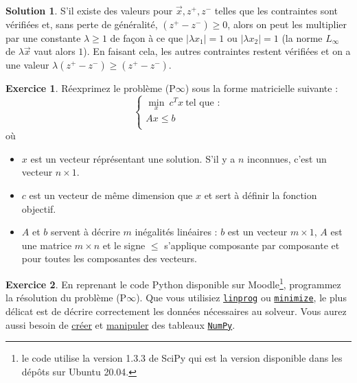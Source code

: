 \documentclass[a4paper,francais]{article}
\theoremstyle{definition}
\newtheorem{exercice}{Exercice}[section]
\newtheorem*{solution}{Solution}
\begin{document}
\begin{solution}
  S'il existe des valeurs pour $\vec{x}, z^+, z^-$ telles que
  les contraintes sont vérifiées et, sans perte de généralité,
  $(z^+ - z^-) \geq 0$, alors on peut les multiplier par une
  constante $\lambda \geq 1$ de façon à ce que $|\lambda x_1|=1$
  ou $|\lambda x_2|=1$
  (la norme $L_\infty$ de $\lambda\vec{x}$ vaut alors $1$).
  En faisant cela, les autres contraintes restent vérifiées
  et on a une valeur $\lambda(z^+ - z^-) \geq (z^+ - z^-)$.
\end{solution}


\begin{exercice}
  Réexprimez le problème (P$\infty$)
  sous la forme matricielle suivante :
  \[
  \left\{
  \begin{array}{c}
    \min_x \ c^T x \ \text{tel que :} \\
    Ax \leq b \\
  \end{array}
  \right. 
  \]
  où 
\begin{itemize}
\item $x$ est un vecteur réprésentant une solution. S'il y a $n$ inconnues, c'est un vecteur $n \times 1$.
\item $c$ est un vecteur de même dimension que $x$ et sert à définir la fonction objectif.
\item $A$ et $b$ servent à décrire $m$ inégalités linéaires : $b$ est un vecteur $m \times 1$,
  $A$ est une matrice $m \times n$ et le signe $\leq$ s'applique composante par composante et pour
  toutes les composantes des vecteurs.
\end{itemize}
\end{exercice}

\begin{exercice}
  En reprenant le code Python disponible sur Moodle\footnote{
    le code utilise la version 1.3.3 de SciPy qui est la version
    disponible dans les dépôts sur Ubuntu 20.04.},
  programmez la résolution du problème (P$\infty$). %
  Que vous utilisiez 
  \href{https://docs.scipy.org/doc/scipy-1.3.3/reference/generated/scipy.optimize.linprog.html#scipy.optimize.linprog}{\texttt{linprog}} ou
  \href{https://docs.scipy.org/doc/scipy-1.3.3/reference/generated/scipy.optimize.minimize.html}{\texttt{minimize}},
  le plus délicat est de décrire correctement les données nécessaires au solveur.
  Vous aurez aussi besoin de
  \href{https://docs.scipy.org/doc/numpy/reference/routines.array-creation.html}{créer} et
  \href{https://docs.scipy.org/doc/numpy/reference/routines.array-manipulation.html}{manipuler} des
  tableaux
  \href{https://numpy.org/doc/stable/contents.html#numpy-docs-mainpage}{\texttt{NumPy}}. 
\end{exercice}
\end{document}
